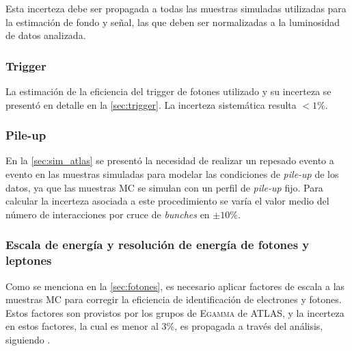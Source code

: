 Esta incerteza debe ser propagada a todas las muestras simuladas utilizadas
para la estimación de fondo y señal, las que deben ser normalizadas a la
luminosidad de datos analizada.


\subsubsection{Trigger}

La estimación de la eficiencia del trigger de fotones utilizado y su incerteza se presentó
en detalle en la \cref{sec:trigger}. La incerteza sistemática resulta $< 1\%$. %



\subsubsection{Pile-up}

En la \cref{sec:sim_atlas} se presentó la necesidad de realizar un repesado
evento a evento en las muestras simuladas para modelar las condiciones de
\emph{pile-up} de los datos, ya que las muestras MC se simulan con un perfil de
\emph{pile-up} fijo. Para calcular la incerteza asociada a este procedimiento se
varía el valor medio del número de interacciones por cruce de \emph{bunches} en
$\pm 10\%$.



\subsubsection{Escala de energía y resolución de energía de fotones y leptones}

Como se menciona en la \cref{sec:fotones}, es necesario aplicar factores de
escala a las muestras MC para corregir la eficiencia de  identificación
de electrones y fotones. Estos factores son provistos por los grupos
de \textsc{Egamma} de ATLAS, y la incerteza en estos factores, la cual es menor al 3\%, es propagada
a través del análisis, siguiendo \cite{PhoEffTwiki,EleEffTwiki,EGScaleTwiki,MCPTwiki}.

